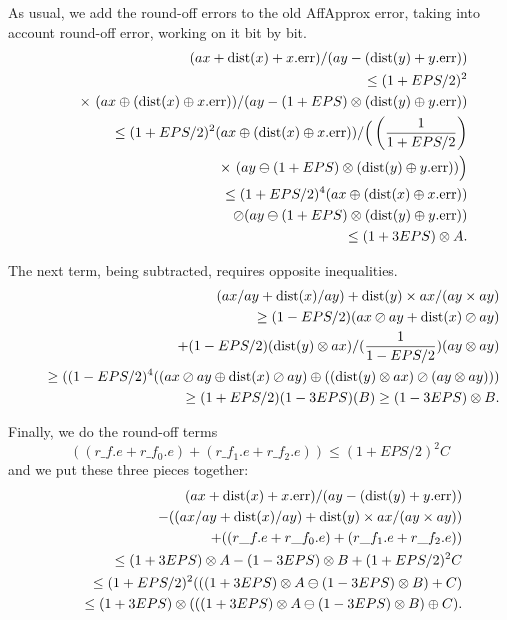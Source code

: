 As usual, we add the round-off errors to the old AffApprox error, 
taking into account round-off error, working on it bit by bit.
\begin{eqnarray*}
 &&\hskip-16pt (ax + {\rm dist}(x) + x.{\rm err})/(ay - ({\rm dist}(y) + y.{\rm err}))\\
&&  \le (1 + EPS/2)^2 \\
&&\quad \times \ (ax \oplus ({\rm dist}(x)
\oplus x.{\rm err}))/
         (ay - (1 + EPS) \otimes ({\rm dist}(y) \oplus y.{\rm err}))\\
&&  \le (1 + EPS/2)^2 (ax \oplus ({\rm dist}(x) \oplus
x.{\rm err}))/
         \Big(\left({1 \over 1 + EPS/2}\right) \\
&&\quad\times \ (ay \ominus (1 + EPS) \otimes ({\rm dist}(y) \oplus y.{\rm err}))\Big)\\
&& \le (1 + EPS/2)^4 (ax
\oplus ({\rm dist}(x) \oplus x.{\rm err}))\\
&&\quad \oslash
         (ay \ominus (1 + EPS) \otimes ({\rm dist}(y) \oplus y.{\rm err}))\\
&& \le   (1 + 3EPS) \otimes A.
\end{eqnarray*}

The next term, being subtracted, requires opposite inequalities.
\begin{eqnarray*}
&&(ax/ay + {\rm dist}(x)/ay) + {\rm dist}(y) \times ax / (ay \times ay)\\
&&\quad \ge (1-EPS/2)(ax \oslash ay + {\rm
dist}(x)
\oslash ay) \\
&&\qquad +  (1-EPS/2) ({\rm dist}(y) \otimes ax )/ ({1 \over 1 - EPS/2})(ay \otimes ay)\\
&&\quad \ge ((1-EPS/2)^4 ((ax
\oslash ay \oplus {\rm dist}(x) \oslash ay) \oplus  (({\rm dist}(y) \otimes ax) \oslash (ay \otimes ay)))\\
&&\quad \ge (1 +
EPS/2)(1 - 3EPS) (B)  \ge (1 - 3EPS) \otimes B.\end{eqnarray*}

Finally, we do the round-off terms 
$$((r\_f.e + r\_f_0.e) + (r\_f_1.e + r\_f_2.e)) \le (1 + EPS/2)^2 C $$
and we put these three pieces together:
\begin{eqnarray*}
&&
(ax + {\rm dist}(x) + x.{\rm err})/(ay - ({\rm dist}(y) + y.{\rm err}))
\\
&&\qquad  - 
((ax/ay + {\rm dist}(x)/ay) + {\rm dist}(y) \times ax / (ay \times ay))\\
&&\qquad
+ ((r\_f.e + r\_f_0.e) + (r\_f_1.e + r\_f_2.e))
\\
&&\quad \le 
(1 + 3EPS) \otimes A - (1 - 3EPS) \otimes B + (1 + EPS/2)^2 C\\
&&\quad \le (1+EPS/2)^2 (
((1 + 3EPS) \otimes A \ominus (1 - 3EPS) \otimes B)
 + C
) \\
&&\quad \le (1+3EPS) \otimes (
((1 + 3EPS) \otimes A \ominus (1 - 3EPS) \otimes B)
 \oplus C
) . \\
\noalign{\vskip-36pt}
\end{eqnarray*}
\enddemo

